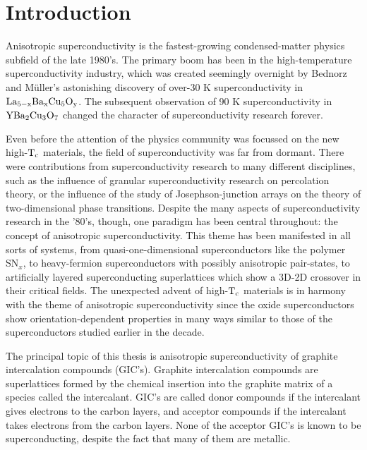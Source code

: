 \chapter{Introduction}
\setcounter{chapter}{1}
\pagestyle{headings}
\label{intro}

        Anisotropic     superconductivity    is     the     fastest-growing
condensed-matter physics subfield of the late 1980's.  The primary boom has
been in the high-temperature superconductivity  industry, which was created
seemingly  overnight  by Bednorz and   M\"uller's astonishing discovery  of
over-30          K         superconductivity         in                $\rm
La_{5-x}Ba_xCu_5O_y$.\cite{muller87} The  subsequent observation of 90
K superconductivity in  $\rm YBa_2Cu_3O_7$\cite{wu87} changed the character
of superconductivity research forever.

        Even before the attention of the physics community  was focussed on
the  new high-$\rm  T_c$ materials, the  field of superconductivity was far
from dormant.  There  were contributions from superconductivity research to
many    different   disciplines,   such  as  the    influence  of  granular
superconductivity research on percolation theory,\cite{orr87,lobb87} or the
influence of the  study  of  Josephson-junction arrays   on the  theory  of
two-dimensional phase  transitions.\cite{nelson79,forrester88} Despite  the
many  aspects of superconductivity  research in   the '80's,  though,   one
paradigm   has been   central  throughout:   the  concept  of   anisotropic
superconductivity.  This theme has been manifested in all sorts of systems,
from     quasi-one-dimensional      superconductors   like     the  polymer
SN$_x$,\cite{greene84}  to   heavy-fermion  superconductors   with possibly
anisotropic   pair-states,\cite{stewart84}    to      artificially  layered
superconducting superlattices  which  show   a  3D-2D crossover  in   their
critical fields.\cite{ruggiero85} The  unexpected  advent of high-$\rm T_c$
materials  is in harmony  with the theme of  anisotropic  superconductivity
since the oxide  superconductors  show orientation-dependent  properties in
many ways similar to those  of  the superconductors studied earlier in  the
decade.\cite{orlando87,worthington87,iye87a,moodera88}

        The principal topic of this thesis is anisotropic superconductivity
of   graphite  intercalation compounds     (GIC's).  Graphite intercalation
compounds   are superlattices  formed  by the  chemical insertion  into the
graphite     matrix     of          a     species         called        the
intercalant.\cite{I94,whittingham82}  GIC's are called donor  compounds  if
the intercalant gives electrons to  the carbon layers, and  acceptor compounds
if  the  intercalant  takes electrons from the  carbon  layers.  None   of the
acceptor GIC's is known  to be superconducting, despite  the fact that many
of them are metallic.\cite{I94,erice:scy}

